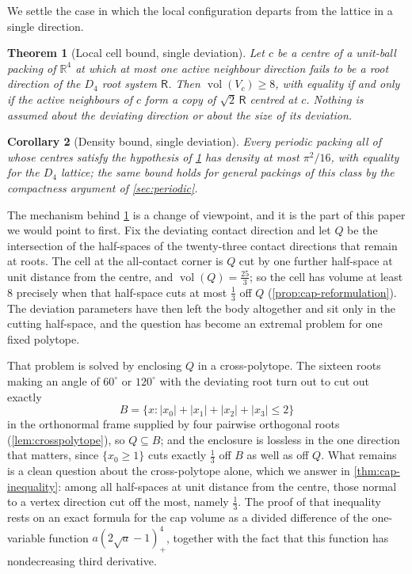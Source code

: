 \documentclass[11pt,reqno]{amsart}
\renewcommand{\_}{\origunderscore\allowbreak}
\numberwithin{equation}{section}
\theoremstyle{plain}
\newtheorem{thm}{Theorem}[section]
\newtheorem{cor}[thm]{Corollary}
\theoremstyle{definition}
\theoremstyle{remark}
\newcommand{\Rt}{\mathsf{R}}                 %
\DeclareMathOperator{\vol}{vol}
\begin{document}
We settle the case in which the local configuration departs from the
lattice in a single direction.

\begin{thm}[Local cell bound, single deviation]\label{thm:local-uncond}
Let $c$ be a centre of a unit-ball packing of $\mathbb{R}^4$ at which at
most one active neighbour direction fails to be a root direction of the
$D_4$ root system $\Rt$. Then $\vol(V_c)\ge8$, with equality if and only
if the active neighbours of $c$ form a copy of $\sqrt2\,\Rt$ centred at
$c$. Nothing is assumed about the deviating direction or about the size
of its deviation.
\end{thm}

\begin{cor}[Density bound, single deviation]\label{cor:density-uncond}
Every periodic packing all of whose centres satisfy the hypothesis of
\cref{thm:local-uncond} has density at most $\pi^2/16$, with equality
for the $D_4$ lattice; the same bound holds for general packings of this
class by the compactness argument of \cref{sec:periodic}.
\end{cor}

The mechanism behind \cref{thm:local-uncond} is a change of viewpoint,
and it is the part of this paper we would point to first. Fix the deviating
contact direction and let $Q$ be the intersection of the half-spaces of
the twenty-three contact directions that remain at roots. The cell at
the all-contact corner is $Q$ cut by one further half-space at unit
distance from the centre, and $\vol(Q)=\tfrac{25}{3}$; so the cell has
volume at least $8$ precisely when that half-space cuts at most
$\tfrac13$ off $Q$ (\cref{prop:cap-reformulation}). The deviation
parameters have then left the body altogether and sit only in the
cutting half-space, and the question has become an extremal problem for
one fixed polytope.

That problem is solved by enclosing $Q$ in a cross-polytope. The sixteen
roots making an angle of $60^\circ$ or $120^\circ$ with the deviating
root turn out to cut out exactly
\[
  B=\bigl\{x : |x_0|+|x_1|+|x_2|+|x_3|\le2\bigr\}
\]
in the orthonormal frame supplied by four pairwise orthogonal roots
(\cref{lem:crosspolytope}), so $Q\subseteq B$; and the enclosure is
lossless in the one direction that matters, since $\{x_0\ge1\}$ cuts
exactly $\tfrac13$ off $B$ as well as off $Q$. What remains is a clean
question about the cross-polytope alone, which we answer in
\cref{thm:cap-inequality}: among all half-spaces at unit distance from
the centre, those normal to a vertex direction cut off the most, namely
$\tfrac13$. The proof of that inequality rests on an exact formula for
the cap volume as a divided difference of the one-variable function
$a(2\sqrt a-1)_+^4$, together with the fact that this function has
nondecreasing third derivative.
\end{document}
